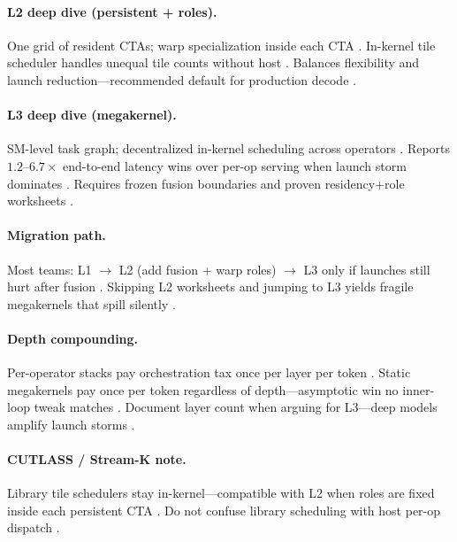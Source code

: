 \paragraph{L2 deep dive (persistent + roles).}
One grid of resident CTAs; warp specialization inside each CTA \citep{shah2024flashattention3,mpk2025}.
In-kernel tile scheduler handles unequal tile counts without host \citep{shah2024flashattention3}.
Balances flexibility and launch reduction---recommended default for production decode \citep{patel2025llminference,nvidia2024cudagraphs}.

\paragraph{L3 deep dive (megakernel).}
SM-level task graph; decentralized in-kernel scheduling across operators \citep{mpk2025,wu2024mirage}.
Reports $1.2$--$6.7\times$ end-to-end latency wins over per-op serving when launch storm dominates \citep{mpk2025,memoryfloor2026,taxbreak2026}.
Requires frozen fusion boundaries and proven residency+role worksheets \citep{yirage2026,chen2020compilerbasedhardw}.

\paragraph{Migration path.}
Most teams: L1 $\rightarrow$ L2 (add fusion + warp roles) $\rightarrow$ L3 only if launches still hurt after fusion \citep{taxbreak2026,patel2025llminference,mpk2025}.
Skipping L2 worksheets and jumping to L3 yields fragile megakernels that spill silently \citep{memoryfloor2026,yirage2026}.

\paragraph{Depth compounding.}
Per-operator stacks pay orchestration tax once per layer per token \citep{taxbreak2026,mpk2025}.
Static megakernels pay once per token regardless of depth---asymptotic win no inner-loop tweak matches \citep{memoryfloor2026,patel2025llminference}.
Document layer count when arguing for L3---deep models amplify launch storms \citep{taxbreak2026,wu2024mirage}.

\paragraph{CUTLASS / Stream-K note.}
Library tile schedulers stay in-kernel---compatible with L2 when roles are fixed inside each persistent CTA \citep{shah2024flashattention3,patel2025llminference}.
Do not confuse library scheduling with host per-op dispatch \citep{taxbreak2026,yirage2026}.

